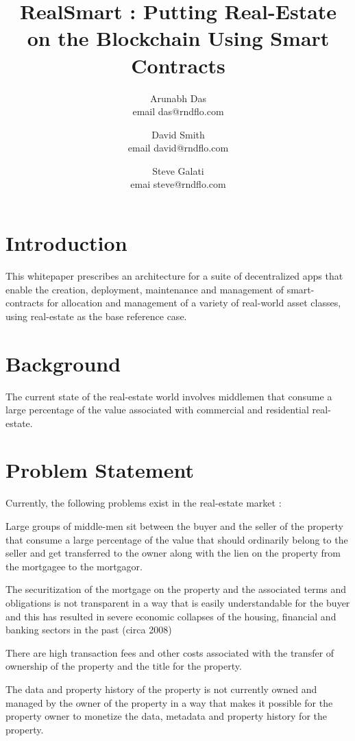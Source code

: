 \documentclass{article}
\author{Arunabh Das \\ email {das@rndflo.com}
   \and David Smith \\ email {david@rndflo.com} 
   \and Steve Galati \\ emai {steve@rndflo.com} }
\title{RealSmart : Putting Real-Estate on the Blockchain Using Smart Contracts}
\date{\vspace{-5ex}}
\begin{document}
\maketitle

\section{Introduction}


This whitepaper prescribes an architecture for a suite of decentralized apps that enable the creation, 
deployment, maintenance and management of smart-contracts for allocation and management of a variety 
of real-world asset classes, using real-estate as the base reference case.




\section{Background}


The current state of the real-estate world involves middlemen that consume a large percentage of the 
value associated with commercial and residential real-estate.

\section{Problem Statement}


Currently, the following problems exist in the real-estate market :

Large groups of middle-men sit between the buyer and the seller of the property that consume a large 
percentage of the value that should ordinarily belong to the seller and get transferred to the owner 
along with the lien on the property from the mortgagee to the mortgagor.


The securitization of the mortgage on the property and the associated terms and obligations is not 
transparent in a way that is easily understandable for the buyer and this has resulted in severe 
economic collapses of the housing, financial and banking sectors in the past (circa 2008)


There are high transaction fees and other costs associated with the transfer of ownership of the property 
and the title for the property.


The data and property history of the property is not currently owned and managed by the owner of the 
property in a way that makes it possible for the property owner to monetize the data, metadata and property history for the property.
\end{document}
